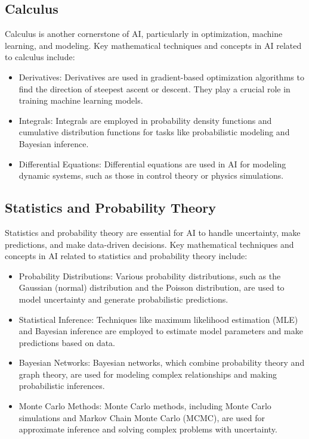 \documentclass[conference]{IEEEtran}
\begin{document}
\subsection{Calculus}

Calculus is another cornerstone of AI, particularly in optimization, machine learning, and modeling. Key mathematical techniques and concepts in AI related to calculus include:
    
    \begin{itemize}
      \item Derivatives: Derivatives are used in gradient-based optimization algorithms to find the direction of steepest ascent or descent. They play a crucial role in training machine learning models.

      \item Integrals: Integrals are employed in probability density functions and cumulative distribution functions for tasks like probabilistic modeling and Bayesian inference.

      \item Differential Equations: Differential equations are used in AI for modeling dynamic systems, such as those in control theory or physics simulations.
    \end{itemize}

\subsection{Statistics and Probability Theory}

Statistics and probability theory are essential for AI to handle uncertainty, make predictions, and make data-driven decisions. Key mathematical techniques and concepts in AI related to statistics and probability theory include:
    
    \begin{itemize}
      \item Probability Distributions: Various probability distributions, such as the Gaussian (normal) distribution and the Poisson distribution, are used to model uncertainty and generate probabilistic predictions.

      \item Statistical Inference: Techniques like maximum likelihood estimation (MLE) and Bayesian inference are employed to estimate model parameters and make predictions based on data.

      \item Bayesian Networks: Bayesian networks, which combine probability theory and graph theory, are used for modeling complex relationships and making probabilistic inferences.

      \item Monte Carlo Methods: Monte Carlo methods, including Monte Carlo simulations and Markov Chain Monte Carlo (MCMC), are used for approximate inference and solving complex problems with uncertainty.
    \end{itemize}
\end{document}
